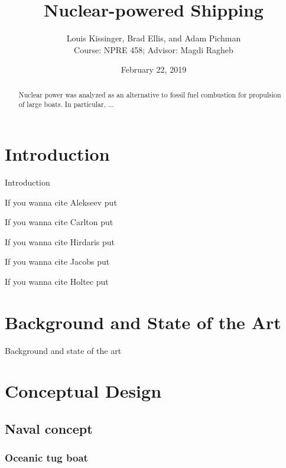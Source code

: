 \documentclass[12pt]{article}
\title{Nuclear-powered Shipping}
\author{Louis Kissinger, Brad Ellis, and Adam Pichman \\Course: NPRE 458; Advisor: Magdi Ragheb}
\date{February 22, 2019}
\begin{document}
\maketitle
%
\pagebreak
\begin{abstract}
Nuclear power was analyzed as an alternative to fossil fuel combustion for propulsion of large boats. In particular, ... 
\end{abstract} 

\pagebreak
\tableofcontents


\section{Introduction}
Introduction

If you wanna cite Alekseev put \cite{alekseev}

If you wanna cite Carlton put \cite{Carlton}

\cite{Gravina}

\cite{Han}

\cite{iaea}

If you wanna cite Hirdaris put \cite{Hirdaris}

If you wanna cite Jacobs put \cite{Jacobs}

If you wanna cite Holtec put \cite{Holtec}

\cite{heuser_burnup}

\cite{ragheb_code}

\cite{ragheb_pres}

\cite{cyl_derivation}

\section{Background and State of the Art}
Background and state of the art
\section{Conceptual Design}
\subsection{Naval concept}
\subsubsection{Oceanic tug boat}
\end{document}
